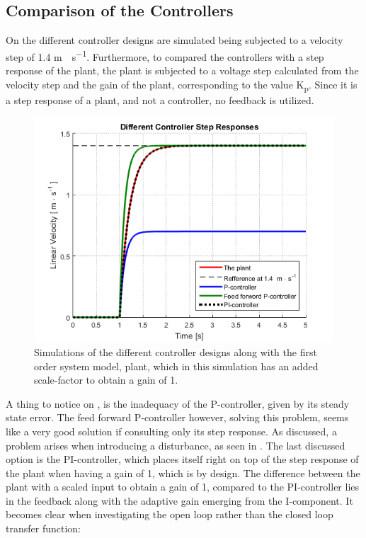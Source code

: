 \subsection{Comparison of the Controllers}
On  the different controller designs are simulated being subjected to a velocity step of 1.4 \si{m \cdot s^{-1}}. Furthermore, to compared the controllers with a step response of the plant, the plant is subjected to a voltage step calculated from the velocity step and the gain of the plant, corresponding to the value \si{K_p}. Since it is a step response of a plant, and not a controller, no feedback is utilized.
%
\begin{figure}[H]
 	\centering
 	\includegraphics[width=.9\textwidth]{figures/ControllerSteps}
 	\caption{Simulations of the different controller designs along with the first order system model, plant, which in this simulation has an added scale-factor to obtain a gain of 1.}
 	\label{fig:ControllerSteps}
 \end{figure}\vspace{-5mm}
%
A thing to notice on , is the inadequacy of the P-controller, given by its steady state error. The feed forward P-controller however, solving this problem, seems like a very good solution if consulting only its step response. As discussed, a problem arises when introducing a disturbance, as seen in . The last discussed option is the PI-controller, which places itself right on top of the step response of the plant when having a gain of 1, which is by design. The difference between the plant with a scaled input to obtain a gain of 1, compared to the PI-controller lies in the feedback along with the adaptive gain emerging from the I-component. It becomes clear when investigating the open loop rather than the closed loop transfer function:
